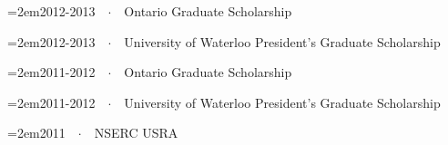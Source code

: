 \documentclass{scrartcl}
\newcommand{\MarginText}[1]{\marginpar{\raggedleft\itshape\small#1}} %
\newcommand{\Description}[1]{\hangindent=2em\hangafter=0\noindent\footnotesize{#1}\par\normalsize\vspace{0.75em}} %
\begin{document}
\begin{cv}{}
\vspace{-0.5em} %

\Description{2012-2013\ \ $\cdotp$\ \ Ontario Graduate Scholarship}


\vspace{-0.5em} %

\Description{2012-2013\ \ $\cdotp$\ \ University of Waterloo President's Graduate Scholarship}


\vspace{-0.5em} %

\Description{2011-2012\ \ $\cdotp$\ \ Ontario Graduate Scholarship}


\vspace{-0.5em} %

\Description{2011-2012\ \ $\cdotp$\ \ University of Waterloo President's Graduate Scholarship}

\vspace{-0.5em} %

\Description{2011\ \ $\cdotp$\ \ NSERC USRA}

\vspace{0.5em}



\end{cv}
\end{document}
